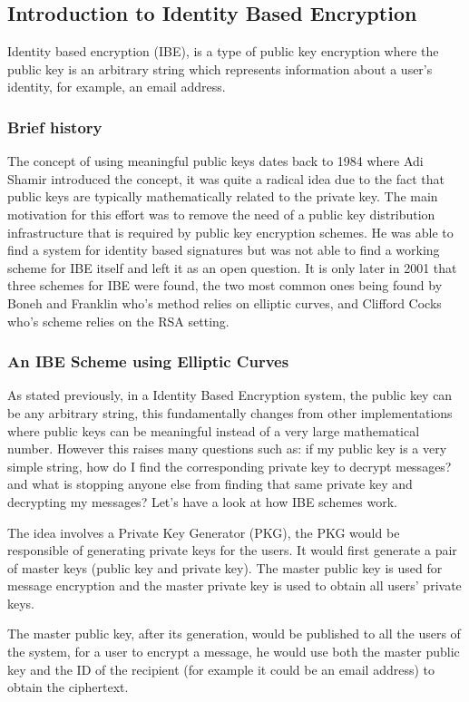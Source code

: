 \documentclass[conference]{IEEEtran}
\begin{document}
\subsection{Introduction to Identity Based Encryption}
Identity based encryption (IBE), is a type of public key encryption 
where the public key is an arbitrary string which represents information
about a user's identity, for example, an email address. 
\subsubsection{Brief history}
The concept of using meaningful public keys dates back to 1984 where Adi Shamir
introduced the concept, it was quite a radical idea due to the fact that 
public keys are typically mathematically related to the private key. The main 
motivation for this effort was to remove the need of a public key distribution
infrastructure that is required by public key encryption schemes.
He was able to find a system for identity based signatures but was not able to 
find a working scheme for IBE itself and left it as an open question. 
It is only later in 2001 that three schemes for IBE 
were found, the two most common ones being 
found by Boneh and Franklin who's method relies on elliptic curves, and 
Clifford Cocks who's scheme relies on the RSA setting.

\subsubsection{An IBE Scheme using Elliptic Curves}
As stated previously, in a Identity Based Encryption system, 
the public key can be any arbitrary string, this fundamentally changes
from other implementations where public keys can be meaningful instead of 
a very large mathematical number. However this raises many questions such as: 
if my public key is a very simple string, how do I find the corresponding private
key to decrypt messages? and what is stopping anyone else from finding that same 
private key and decrypting my messages? Let's have a look at how IBE schemes work.


The idea involves a Private Key Generator (PKG), the PKG would be responsible 
of generating private keys for the users. It would first generate a pair of 
master keys (public key and private key). 
The master public key is used for message encryption and the master
private key is used to obtain all users' private keys.


The master public key, after its generation, would be published to all the users of the system, for a user 
to encrypt a message, he would use both the master public key and the ID of the recipient
(for example it could be an email address) to obtain the ciphertext.
\end{document}
